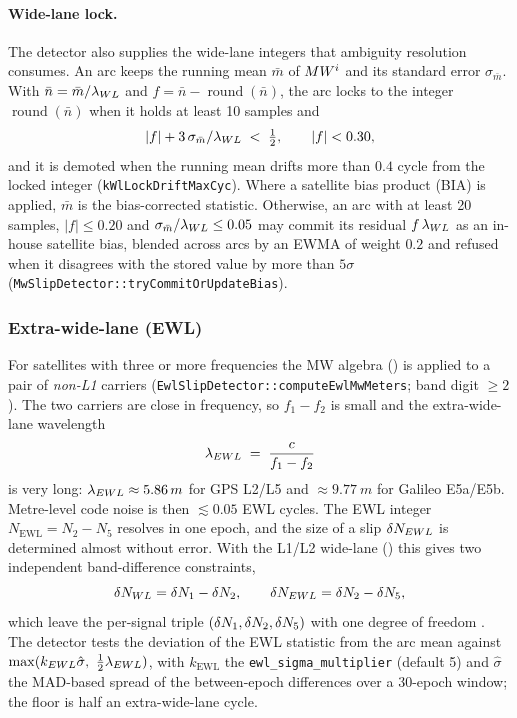 \documentclass[main.tex]{subfiles}
\begin{document}
\paragraph{Wide-lane lock.}
The detector also supplies the wide-lane integers that ambiguity
resolution consumes.  An arc keeps the running mean $\bar m$ of
$MW^i$ and its standard error $\sigma_{\bar m}$.  With
$\bar n = \bar m / \lambda_{WL}$ and $f = \bar n - \operatorname{round}(\bar n)$,
the arc locks to the integer $\operatorname{round}(\bar n)$ when it holds
at least 10 samples and
\begin{equation}
\lvert f \rvert + 3\,\sigma_{\bar m}/\lambda_{WL} \;<\; \tfrac12,
\qquad \lvert f \rvert < 0.30 ,
\label{eq:mw-lock}
\end{equation}
and it is demoted when the running mean drifts more than $0.4$ cycle from
the locked integer (\texttt{kWlLockDriftMaxCyc}).  Where a satellite bias
product (BIA) is applied, $\bar m$ is the bias-corrected statistic.
Otherwise, an arc with at least 20 samples, $\lvert f \rvert \le 0.20$ and
$\sigma_{\bar m}/\lambda_{WL} \le 0.05$ may commit its residual $f\,\lambda_{WL}$ as an
in-house satellite bias, blended across arcs by an EWMA of weight $0.2$ and
refused when it disagrees with the stored value by more than $5\sigma$
(\texttt{MwSlipDetector::tryCommitOrUpdateBias}).

\subsubsection{Extra-wide-lane (EWL)}\label{sec:slip-ewl}

For satellites with three or more frequencies the MW algebra
() is applied to a pair of \emph{non-L1} carriers
(\texttt{EwlSlipDetector::computeEwlMwMeters}; band digit $\ge 2$).  The
two carriers are close in frequency, so $f_1 - f_2$ is small and the
extra-wide-lane wavelength
\begin{equation}
\lambda_{EWL} \;=\; \frac{c}{f_1 - f_2}
\label{eq:ewl-wavelength}
\end{equation}
is very long: $\lamewl \approx \SI{5.86}{m}$ for GPS L2/L5 and
$\approx \SI{9.77}{m}$ for Galileo E5a/E5b.  Metre-level code noise is
then $\lesssim 0.05$ EWL cycles.  The EWL integer
$N_{\mathrm{EWL}} = N_2 - N_5$ resolves in one epoch, and the size of a
slip $\delta N_{EWL}$ is determined almost without error.  With
the L1/L2 wide-lane () this gives two independent
band-difference constraints,
\begin{equation}
\delta N_{WL} = \delta N_1 - \delta N_2,
\qquad
\delta N_{EWL} = \delta N_2 - \delta N_5,
\label{eq:wl-ewl-system}
\end{equation}
which leave the per-signal triple $(\delta N_1, \delta N_2, \delta N_5)$
with one degree of freedom \cite{geng2013triple}.  The detector tests the
deviation of the EWL statistic from the arc mean against
$\max(k_{\mathrm{EWL}}\hat\sigma,\ \tfrac12\lamewl)$, with
$k_{\mathrm{EWL}}$ the \texttt{ewl\_sigma\_multiplier} (default 5) and
$\hat\sigma$ the MAD-based spread of the between-epoch differences over a
30-epoch window; the floor is half an extra-wide-lane cycle.
\end{document}
